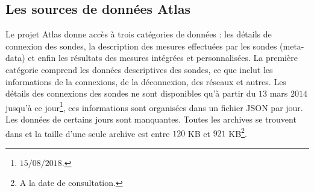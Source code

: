 \begin{table}[H]
	\centering
	\caption{Comparaison entre les sondes et les ancres}
	\label{tab:comparaison-sonde-ancre}
\end{table}
\subsection{Les sources de données Atlas} \label{subsec:sources-data}

Le projet Atlas donne accès à trois catégories de données : les détails de connexion des sondes, la description des mesures effectuées par les sondes (meta-data) et enfin
les résultats des mesures intégrées et personnalisées.
La première catégorie comprend  les données descriptives des  sondes, ce que inclut
les informations de la connexions, de la déconnexion, des réseaux et autres. Les détails des connexions des sondes ne sont disponibles qu'à partir du  $13$ mars $2014$ jusqu'à ce jour\footnote{$15/08/2018$.}, ces informations sont organisées dans un fichier JSON par jour.
Les données de certains jours sont manquantes.  Toutes les archives se trouvent dans \cite{probes-data} et la taille d'une seule archive est entre $120 $ KB et $921$ KB\footnote{A la date de consultation.}. 

